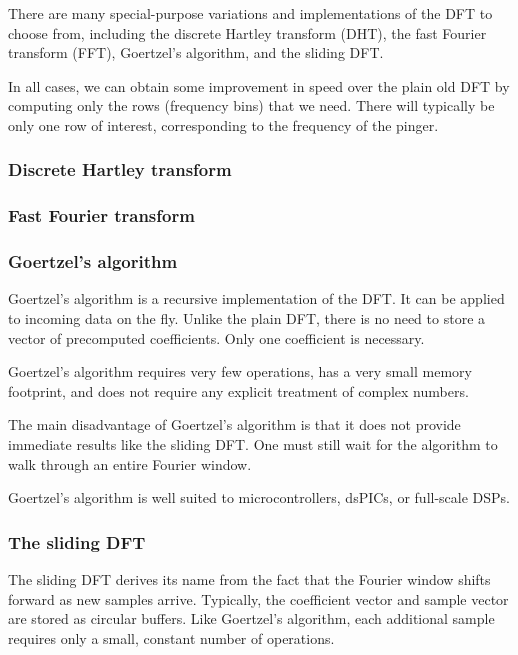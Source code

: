 \documentclass[10pt]{article}
\begin{document}
There are many special-purpose variations and implementations of the DFT to choose from, including the discrete Hartley transform (DHT), the fast Fourier transform (FFT), Goertzel's algorithm, and the sliding DFT.

In all cases, we can obtain some improvement in speed over the plain old DFT by computing only the rows (frequency bins) that we need.  There will typically be only one row of interest, corresponding to the frequency of the pinger.

\subsubsection{Discrete Hartley transform}

\subsubsection{Fast Fourier transform}

\subsubsection{Goertzel's  algorithm}

Goertzel's algorithm is a recursive implementation of the DFT.   It can be applied to incoming data on the fly.  Unlike the plain DFT, there is no need to store a vector of precomputed coefficients.  Only one coefficient is necessary.

Goertzel's algorithm requires very few operations, has a very small memory footprint, and does not require any explicit treatment of complex numbers.

The main disadvantage of Goertzel's algorithm is that it does not provide immediate results like the sliding DFT.  One must still wait for the algorithm to walk through an entire Fourier window.

Goertzel's algorithm is well suited to microcontrollers, dsPICs, or full-scale DSPs.

\subsubsection{The sliding DFT}

The sliding DFT derives its name from the fact that the Fourier window shifts forward as new samples arrive.  Typically, the coefficient vector and sample vector are stored as circular buffers.  Like Goertzel's algorithm, each additional sample requires only a small, constant number of operations.
\end{document}
